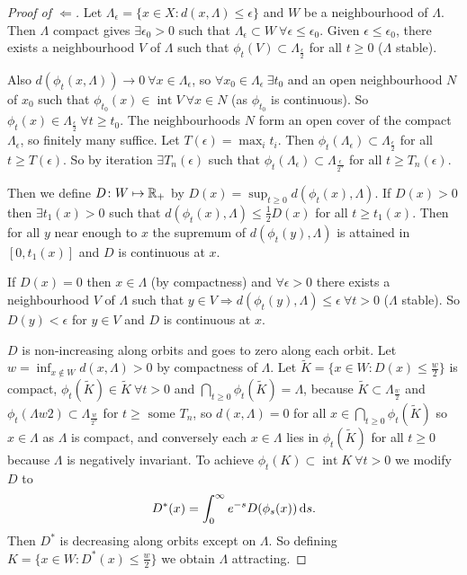\documentclass{notes}
\theoremstyle{plain}
\DeclareMathOperator{\inter}{int}
\begin{document}
\begin{proof}[Proof of $\Leftarrow$]
Let $\Lambda_\epsilon = \{ x \in X : d(x,\Lambda) \le \epsilon \}$ and
$W$ be a neighbourhood of $\Lambda$.  Then $\Lambda$ compact gives
$\exists \epsilon_0 > 0$ such that $\Lambda_\epsilon \subset W\ \forall
\epsilon \le \epsilon_0$.  Given $\epsilon \le \epsilon_0$, there exists
a neighbourhood $V$ of $\Lambda$ such that $\phi_t(V) \subset
\Lambda_{\frac{\epsilon}{2}}$ for all $t \ge 0$ ($\Lambda$ stable).

Also $d(\phi_t(x,\Lambda)) \to 0\ \forall x \in \Lambda_\epsilon$, so
$\forall x_0 \in \Lambda_\epsilon\ \exists t_0$ and an open neighbourhood
$N$ of $x_0$ such that $\phi_{t_0}(x) \in \inter V\ \forall x \in N$
(as $\phi_{t_0}$ is continuous).  So $\phi_t(x) \in
\Lambda_{\frac{\epsilon}{2}}\ \forall t \ge t_0$.  The neighbourhoods
$N$ form an open cover of the compact $\Lambda_\epsilon$, so finitely many
suffice.  Let $T(\epsilon) = \max_i t_i$.  Then $\phi_t(\Lambda_\epsilon)
\subset \Lambda_{\frac{\epsilon}{2}}$ for all $t \ge T(\epsilon)$.  So
by iteration $\exists T_n(\epsilon)$ such that $\phi_t(\Lambda_\epsilon)
\subset \Lambda_{\frac{\epsilon}{2^n}}$ for all $t \ge T_n(\epsilon)$.

Then we define $D \colon W \mapsto \mathbb{R}_+$ by $D(x) = \sup_{t \ge 0}
d(\phi_t(x),\Lambda)$.  If $D(x) > 0$ then $\exists t_1(x) > 0$ such
that $d(\phi_t(x),\Lambda) \le \frac{1}{2} D(x)$ for all $t \ge t_1(x)$.  Then
for all $y$ near enough to $x$ the supremum of $d(\phi_t(y), \Lambda)$
is attained in $[0,t_1(x)]$ and $D$ is continuous at $x$.

If $D(x) = 0$ then $x \in \Lambda$ (by compactness) and $\forall \epsilon
> 0$ there exists a neighbourhood $V$ of $\Lambda$ such that
$y \in V \Rightarrow d(\phi_t(y),\Lambda) \le \epsilon\ 
\forall t > 0$ ($\Lambda$ stable).  So $D(y) < \epsilon$ for $y \in V$
and $D$ is continuous at $x$.

$D$ is non-increasing along orbits and goes to zero along each orbit.  Let
$w = \inf_{x \notin W} d(x,\Lambda) > 0$ by compactness of $\Lambda$.
Let $\tilde{K} = \{ x \in W : D(x) \le \frac{w}{2} \}$ is compact,
$\phi_t(\tilde{K}) \in \tilde{K}\ \forall t > 0$ and $\bigcap_{t \ge 0}
\phi_t(\tilde{K}) = \Lambda$, because $\tilde{K} \subset \Lambda_{\frac{w}{2}}$
and $\phi_t(\Lambda{w}{2}) \subset \Lambda_{\frac{w}{2^n}}$ for
$t \ge \text{ some } T_n$, so $d(x,\Lambda) = 0$ for all $x \in 
\bigcap_{t \ge 0} \phi_t(\tilde{K})$ so $x \in \Lambda$ as $\Lambda$ is
compact, and conversely each $x \in \Lambda$ lies in $\phi_t(\tilde{K})$
for all $t \ge 0$ because $\Lambda$ is negatively invariant.  To achieve
$\phi_t(K) \subset \inter K\ \forall t > 0$ we modify
$D$ to
\[
D^*(x) = \int_0^\infty e^{-s} D(\phi_s(x))\,\mathrm{d} s.
\]
Then $D^*$ is decreasing along orbits except on $\Lambda$.  So defining
$K = \{ x \in W : D^*(x) \le \frac{w}{2} \}$ we obtain $\Lambda$ attracting.
\end{proof}
\end{document}
